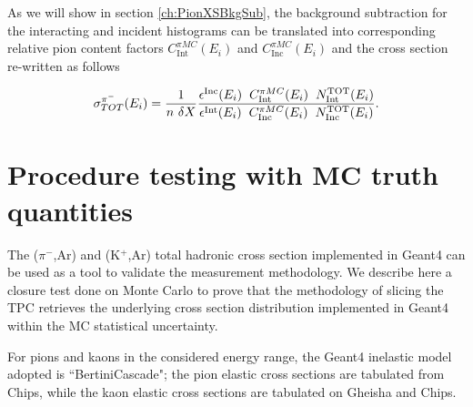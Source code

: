As we will show in section \ref{ch:PionXSBkgSub}, the background subtraction for the interacting and incident histograms can be translated into corresponding relative pion content factors $C^{\pi MC}_{\text{Int}} (E_{i})$ and $C^{\pi MC}_{\text{Inc}} (E_{i})$ and the cross section re-written as follows

\begin{equation}
      \sigma^{\pi^-}_{TOT}(E_{i})  = \frac{1}{n\text{ } \delta X}\frac{ \epsilon^{\text{Inc}}(E_i)  \hspace{0.2cm} C^{\pi MC}_{\text{Int}} (E_{i}) \hspace{0.2cm} N^{\text{TOT}}_{\text{Int}} (E_{i}) }{   \epsilon^{\text{Int}}(E_i) \hspace{0.2cm} C^{\pi MC}_{\text{Inc}} (E_{i}) \hspace{0.2cm}  N^{\text{TOT}}_{\text{Inc}} (E_{i})}.
\label{eq:C}
\end{equation}








\section{Procedure testing with MC truth quantities}\label{ch:procedureTesting}
The ($\pi^{-}$,Ar) and (K$^{+}$,Ar) total hadronic cross section implemented in Geant4 can be used as a tool to validate the measurement methodology.  We describe here a closure test done on Monte Carlo to prove that the methodology of slicing the TPC retrieves the underlying cross section distribution implemented in Geant4 within the MC statistical uncertainty. 

For pions and kaons in the considered energy range, the Geant4 inelastic model adopted is ``BertiniCascade"; the pion elastic cross sections are tabulated from Chips, while the kaon elastic cross sections are tabulated on Gheisha and Chips.

